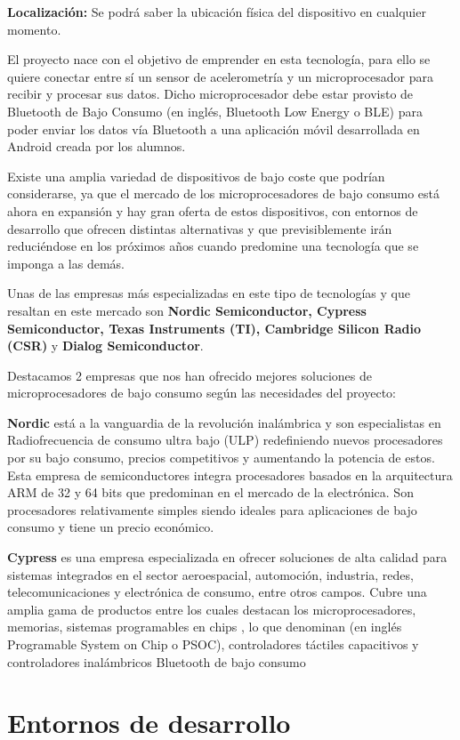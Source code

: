 \textbf{Localización:} Se podrá saber la ubicación física del dispositivo en cualquier momento.

El proyecto nace con el objetivo de emprender en esta tecnología, para ello se quiere conectar entre sí un sensor de acelerometría y un microprocesador para recibir y procesar sus datos. Dicho microprocesador debe estar provisto de Bluetooth de Bajo Consumo (en inglés, Bluetooth Low Energy o BLE) para poder enviar los datos vía Bluetooth a una aplicación móvil desarrollada en Android creada por los alumnos.

Existe una amplia variedad de dispositivos de bajo coste que podrían considerarse, ya que el mercado de los microprocesadores de bajo consumo está ahora en expansión y hay gran oferta de estos dispositivos, con entornos de desarrollo que ofrecen distintas alternativas y que previsiblemente irán reduciéndose en los próximos años cuando predomine una tecnología que se imponga a las demás.

Unas de las  empresas más especializadas en este tipo de tecnologías y que resaltan en este mercado son \textbf{Nordic Semiconductor, Cypress Semiconductor, Texas Instruments (TI), Cambridge Silicon Radio (CSR)} y \textbf{Dialog Semiconductor}.

Destacamos 2 empresas que nos han ofrecido mejores soluciones de microprocesadores de bajo consumo según las necesidades del proyecto:

\textbf{Nordic} está a la vanguardia de la revolución inalámbrica y son especialistas en Radiofrecuencia de consumo ultra bajo (ULP) redefiniendo nuevos procesadores por su bajo consumo, precios competitivos y aumentando la potencia de estos.
Esta empresa de semiconductores integra procesadores basados en la arquitectura ARM de 32 y 64 bits que predominan en el mercado de la electrónica. Son procesadores relativamente simples siendo ideales para aplicaciones de bajo consumo y tiene un precio económico. 

\textbf{Cypress} es una empresa especializada en ofrecer soluciones de alta calidad para sistemas integrados en el sector aeroespacial, automoción, industria, redes, telecomunicaciones y electrónica de consumo, entre otros campos. Cubre una amplia gama de productos entre los cuales destacan los microprocesadores, memorias,  sistemas programables en chips , lo que denominan (en inglés Programable System on Chip o PSOC), controladores táctiles capacitivos y controladores inalámbricos Bluetooth de bajo consumo

\section{Entornos de desarrollo}
\label{makereference1.1}

